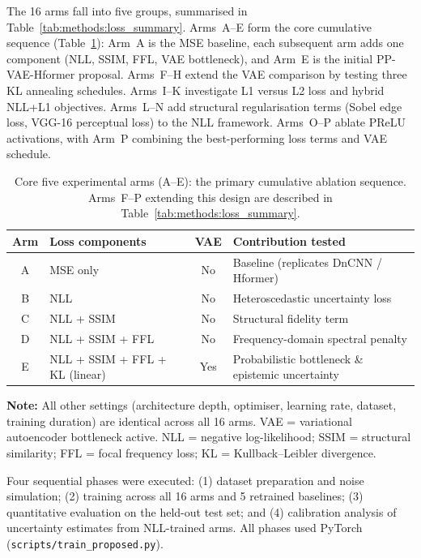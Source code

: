 \documentclass[12pt, a4paper, twoside, openright]{book}
\begin{document}
The 16 arms fall into five groups, summarised in Table~\ref{tab:methods:loss_summary}. Arms~A--E form the core cumulative sequence (Table~\ref{tab:methods:arms}): Arm~A is the MSE baseline, each subsequent arm adds one component (NLL, SSIM, FFL, VAE bottleneck), and Arm~E is the initial PP-VAE-Hformer proposal. Arms~F--H extend the VAE comparison by testing three KL annealing schedules. Arms~I--K investigate L1 versus L2 loss and hybrid NLL+L1 objectives. Arms~L--N add structural regularisation terms (Sobel edge loss, VGG-16 perceptual loss) to the NLL framework. Arms~O--P ablate PReLU activations, with Arm~P combining the best-performing loss terms and VAE schedule.
\begin{table}[htbp]
  \centering
  \caption{Core five experimental arms (A--E): the primary cumulative ablation sequence. Arms~F--P extending this design are described in Table~\ref{tab:methods:loss_summary}.}
  \label{tab:methods:arms}
  \small
  \begin{tabular}{c p{3.8cm} c p{4.5cm}}
    \toprule
    \textbf{Arm} & \textbf{Loss components} & \textbf{VAE} & \textbf{Contribution tested} \\
    \midrule
    A & MSE only                                 & No  & Baseline (replicates DnCNN / Hformer) \\
    B & NLL                                      & No  & Heteroscedastic uncertainty loss \\
    C & NLL + SSIM                               & No  & Structural fidelity term \\
    D & NLL + SSIM + FFL                         & No  & Frequency-domain spectral penalty \\
    E & NLL + SSIM + FFL + KL (linear)           & Yes & Probabilistic bottleneck \& epistemic uncertainty \\
    \bottomrule
  \end{tabular}

  \vspace{0.3em}
  {\footnotesize \textbf{Note:} All other settings (architecture depth, optimiser, learning rate,
  dataset, training duration) are identical across all 16 arms. VAE = variational autoencoder bottleneck active.
  NLL = negative log-likelihood; SSIM = structural similarity; FFL = focal frequency loss;
  KL = Kullback--Leibler divergence.}
\end{table}
Four sequential phases were executed: (1) dataset preparation and noise simulation; (2) training across all 16 arms and 5 retrained baselines; (3) quantitative evaluation on the held-out test set; and (4) calibration analysis of uncertainty estimates from NLL-trained arms. All phases used PyTorch \cite{paszke_pytorch_2019} (\texttt{scripts/train\_proposed.py}).
\end{document}
